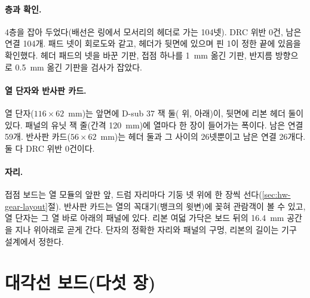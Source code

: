 \paragraph{층과 확인.} 4층을 잡아 두었다(배선은 링에서 모서리의 헤더로 가는 104넷). DRC 위반 0건, 남은 연결 104개.
패드 넷이 회로도와 같고, 헤더가 뒷면에 있으며 핀 1이 정한 끝에 있음을 확인했다. 헤더 패드의 넷을 바꾼 기판, 접점
하나를 1~mm 옮긴 기판, 반지름 방향으로 0.5~mm 옮긴 기판을 검사가 잡았다.

\paragraph{열 단자와 반사판 카드.} 열 단자($116 \times 62$~mm)는 앞면에 D-sub 37 잭 둘( 위, 
아래)이, 뒷면에 리본 헤더 둘이 있다. 패널의 유닛 잭 줄(간격 120~mm)에 열마다 한 장이 들어가는 폭이다. 남은 연결
59개. 반사판 카드($56 \times 62$~mm)는 헤더 둘과 그 사이의 26넷뿐이고 남은 연결 26개다. 둘 다 DRC 위반 0건이다.

\paragraph{자리.} 접점 보드는 열 모듈의 앞판 앞, 드럼 자리마다 기둥 넷 위에 한 장씩 선다(\ref{sec:hw-gear-layout}절).
반사판 카드는 열의 꼭대기(뱅크의 윗변)에 꽂혀 관람객이 볼 수 있고, 열 단자는 그 열 바로 아래의 패널에 있다. 리본
여덟 가닥은 보드 뒤의 16.4~mm 공간을 지나 위아래로 곧게 간다. 단자의 정확한 자리와 패널의 구멍, 리본의 길이는
기구 설계에서 정한다.


\section{대각선 보드(다섯 장)}\label{pcb:diagonal}

